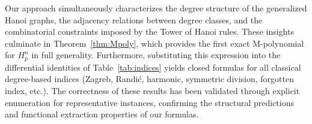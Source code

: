 \documentclass[letterpaper,12pt]{article}
\begin{document}
Our approach simultaneously characterizes the degree structure of the generalized Hanoi graphs,
the adjacency relations between degree classes, and the combinatorial constraints imposed by the
Tower of Hanoi rules. These insights culminate in Theorem~\ref{thm:Mpoly}, which provides the
first exact M-polynomial for $H_p^n$ in full generality. Furthermore, substituting this expression
into the differential identities of Table~\ref{tab:indices} yields closed formulas for all classical
degree-based indices (Zagreb, Randić, harmonic, symmetric division, forgotten index, etc.).
The correctness of these results has been validated through explicit enumeration for representative
instances, confirming the structural predictions and functional extraction properties of our formulas.



 





\end{document}
